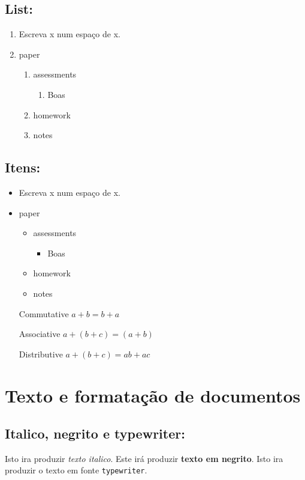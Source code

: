 \documentclass[a4paper]{article}
\begin{document}
 \subsection{List:}
 \begin{enumerate}
  \item Escreva x num espaço de x.
  \item paper
  \begin{enumerate}
   \item assessments
   \begin {enumerate}
   \item Boas
   \end {enumerate}
   \item homework
   \item notes
  \end{enumerate}
 \end{enumerate}  

 \subsection{Itens:}
 \begin{itemize}
  \item Escreva x num espaço de x.
  \item paper
  \begin{itemize}
   \item assessments
   \begin {itemize}
   \item Boas
   \end {itemize}
   \item homework
   \item notes
  \end{itemize}
 \end{itemize}  

 \begin{enumerate}
  \item[Commutative]$a+b=b+a$
  \item[Associative]$a+(b+c)=(a+b)$
  \item[Distributive]$a+(b+c)=ab+ac$
 \end{enumerate}
 
 \newpage
\section{Texto e formatação de documentos}
\subsection{Italico, negrito e typewriter:}
Isto ira produzir \textit{texto italico}.
Este irá produzir \textbf{texto em negrito}.
Isto ira produzir o texto em fonte \texttt{typewriter}.
\end{document}
